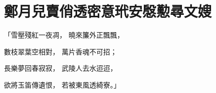 %

\chapter{鄭月兒賣俏透密意\KG 玳安慇懃尋文嫂}


\begin{showcontents}{}




「雪壓殘紅一夜凋，  曉來簾外正飄飄，

數枝翠葉空相對，  萬片香魂不可招；

長樂夢回春寂寂，  武陵人去水迢迢，

欲將玉笛傳遺恨，  若被東風透綺寮。」


\end{showcontents}
